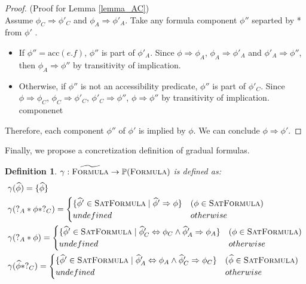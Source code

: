 \documentclass {article}
\newtheorem{definition}[theorem]{Definition}
\newcommand{\fphi}{\widehat{\phi}}
\newcommand{\acc}[1]{\text{acc}(#1)}
\newcommand{\imp}{\Rightarrow}
\newcommand{\satdef}{\textsc{SatFormula}}
\newcommand{\formula}{\textsc{Formula}}
\newcommand{\gradformula}{\widetilde{\textsc{Formula}}}
\begin{document}
\begin{proof} (Proof for Lemma \ref{lemma_AC})\\
    Assume $\phi_C \Rightarrow \phi'_C$ and $\phi_A \Rightarrow \phi'_A$. Take any formula component $\phi''$ separted by *  from $\phi'$ . 
\begin{itemize}
    \item If $\phi'' = \acc{e.f}$, $\phi''$ is part of $\phi'_A$. Since $\phi \imp \phi_A$, $\phi_A \imp \phi'_A$ and $\phi'_A \imp \phi''$, then $\phi_A \imp \phi''$ by transitivity of implication.  
    \item Otherwise, if $\phi''$ is not an accessibility predicate, $\phi''$ is part of $\phi'_C$. Since $\phi \imp \phi_C$, $\phi_C \imp \phi'_C$, $\phi'_C \imp \phi''$, $\phi \imp \phi''$ by transitivity of implication.  componenet 
\end{itemize}    
Therefore, each component $\phi''$ of $\phi'$ is implied by $\phi$. We can conclude $\phi \imp \phi'$.
\end{proof}

Finally, we propose a concretization definition of gradual formulas.
\begin{definition}
\label{def_conc}
$\gamma : \gradformula \rightarrow \mathbb{P}(\formula)$ is defined as:
\begin{align*}
&\gamma(\fphi) = \{\fphi\}\\
&\gamma(?_A \ast \phi \ast ?_C) = 
    \begin{cases}
     \{\fphi' \in \satdef \mid \fphi' \imp \phi\} & (\phi \in \satdef)\\
     undefined &otherwise\\
    \end{cases} \\
&\gamma(?_A \ast \phi) = 
    \begin{cases}
     \{\fphi' \in \satdef \mid \fphi'_C \Leftrightarrow \phi_C \wedge \fphi'_A \imp \phi_A\} & (\phi \in \satdef)\\
     undefined &otherwise\\
    \end{cases} \\
&\gamma(\fphi \ast ?_C) = 
    \begin{cases}
     \{\fphi' \in \satdef \mid \fphi'_A \Leftrightarrow \phi_A \wedge \fphi'_C \imp \phi_C\} & (\fphi \in \satdef)\\
     undefined &otherwise\\
    \end{cases} \\
\end{align*}
\end{definition}
\end{document}
